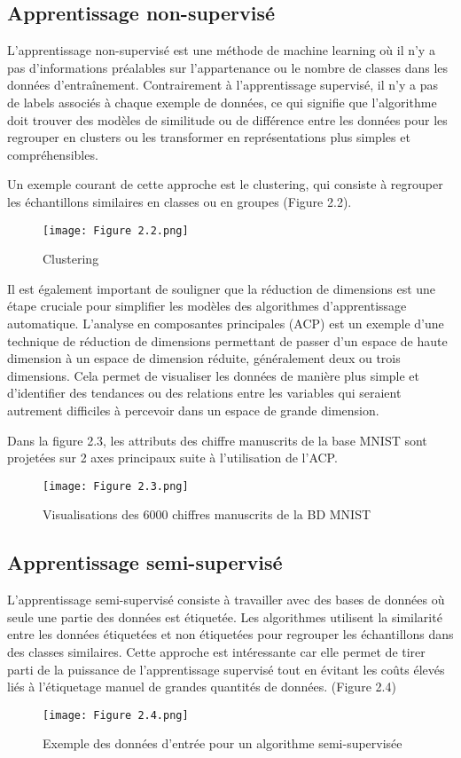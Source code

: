 \subsection{Apprentissage non-supervisé}
L'apprentissage non-supervisé est une méthode de machine learning où il n'y a pas d'informations préalables sur l'appartenance ou le nombre de classes dans les données d'entraînement. Contrairement à l'apprentissage supervisé, il n'y a pas de labels associés à chaque exemple de données, ce qui signifie que l'algorithme doit trouver des modèles de similitude ou de différence entre les données pour les regrouper en clusters ou les transformer en représentations plus simples et compréhensibles.

Un exemple courant de cette approche est le clustering, qui consiste à regrouper les échantillons similaires en classes ou en groupes (Figure 2.2).
\newpage
\begin{figure}[!h]
  \centering
  \texttt{[image: Figure 2.2.png]}
  \caption{Clustering}
  \label{fig:Clustering}
\end{figure}

Il est également important de souligner que la réduction de dimensions est une étape cruciale pour simplifier les modèles des algorithmes d'apprentissage automatique. L'analyse en composantes principales (ACP) est un exemple d'une technique de réduction de dimensions permettant de passer d'un espace de haute dimension à un espace de dimension réduite, généralement deux ou trois dimensions. Cela permet de visualiser les données de manière plus simple et d'identifier des tendances ou des relations entre les variables qui seraient autrement difficiles à percevoir dans un espace de grande dimension.

Dans la figure 2.3, les attributs des chiffre manuscrits de la base MNIST sont projetées sur 2 axes principaux suite à l'utilisation de l'ACP.
\begin{figure}[!h]
  \centering
  \texttt{[image: Figure 2.3.png]}
  \caption{Visualisations des 6000 chiffres manuscrits de la BD MNIST}
  \label{fig:Visualisations des 6000 chiffres manuscrits de la BD MNIST}
\end{figure}
\newpage
\subsection{Apprentissage semi-supervisé}
L'apprentissage semi-supervisé consiste à travailler avec des bases de données où seule une partie des données est étiquetée. Les algorithmes utilisent la similarité entre les données étiquetées et non étiquetées pour regrouper les échantillons dans des classes similaires. Cette approche est intéressante car elle permet de tirer parti de la puissance de l'apprentissage supervisé tout en évitant les coûts élevés liés à l'étiquetage manuel de grandes quantités de données. (Figure 2.4)
\begin{figure}[!h]
  \centering
  \texttt{[image: Figure 2.4.png]}
  \caption{Exemple des données d’entrée pour un algorithme semi-supervisée}
  \label{fig:Exemple des données d’entrée pour un algorithme semi-supervisée}
\end{figure}

